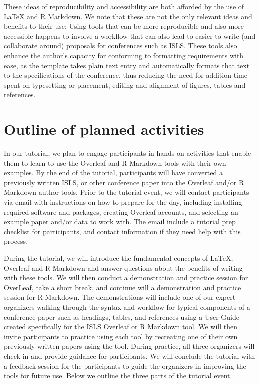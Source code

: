 \documentclass{article}
\begin{document}
These ideas of reproducibility and accessibility are both afforded by the use of LaTeX and
R Markdown. We note that these are not the only relevant ideas and benefits to their use:
Using tools that can be more reproducible and also more accessible happens to involve a workflow
that can also lead to easier to write (and collaborate around) proposals for conferences such as ISLS. These tools also enhance the author's capacity for conforming to formatting requirements with ease, as the template takes plain text entry and automatically formats that text to the specifications of the conference, thus reducing the need for addition time spent on typesetting or placement, editing and alignment of figures, tables and references. 

\section{Outline of planned activities}
In our tutorial, we plan to engage participants in hands-on activities that enable them to learn to use the Overleaf and R Markdown tools with their own examples. By the end of the tutorial, participants will have converted a previously written ISLS, or other conference paper into the Overleaf and/or R Markdown author tools. Prior to the tutorial event, we will contact participants via email with instructions on how to prepare for the day, including installing required software and packages, creating Overleaf accounts, and selecting an example paper and/or data to work with. The email include a tutorial prep checklist for participants, and contact information if they need help with this process.

During the tutorial, we will introduce the fundamental concepts of LaTeX, Overleaf and R Markdown and answer questions about the benefits of writing with these tools. We will then conduct a demonstration and practice session for OverLeaf, take a short break, and continue will a demonstration and practice session for R Markdown. The demonstrations will include one of our expert organizers walking through the syntax and workflow for typical components of a conference paper such as headings, tables, and references using a User Guide created specifically for the ISLS Overleaf or R Markdown tool. We will then invite participants to practice using each tool by recreating one of their own previously written papers using the tool. During practice, all three organizers will check-in and provide guidance for participants. We will conclude the tutorial with a feedback session for the participants to guide the organizers in improving the tools for future use. Below we outline the three parts of the tutorial event.
\end{document}
